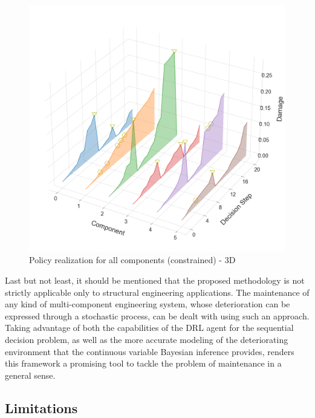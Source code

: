 \begin{figure}[H]
    \centering
    \includegraphics[width=\textwidth]{Figures/allCompsPolReal.png}
	\caption{Policy realization for all components (constrained) - 3D}
	\label{3dPolReal}
\end{figure}

Last but not least, it should be mentioned that the proposed methodology is not strictly applicable only to structural engineering applications. The maintenance of any kind of multi-component engineering system, whose deterioration can be expressed through a stochastic process, can be dealt with using such an approach. Taking advantage of both the capabilities of the \gls{DRL} agent for the sequential decision problem, as well as the more accurate modeling of the deteriorating environment that the continuous variable Bayesian inference provides, renders this framework a promising tool to tackle the problem of maintenance in a general sense.


\subsection{Limitations}

